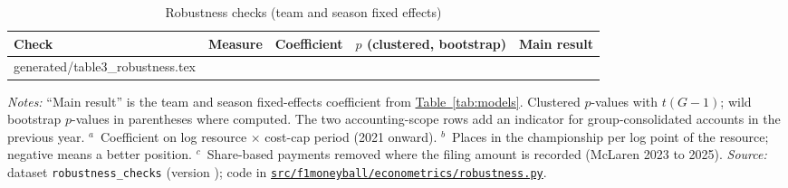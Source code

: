 \documentclass[11pt,a4paper]{article}
\newcommand{\repo}{https://github.com/NahianIbnat-2000/F1-moneyball}
\newcommand{\code}[1]{\href{\repo/blob/main/#1}{\nolinkurl{#1}}}
\begin{document}
\begin{table}[htbp]
\centering
\begin{threeparttable}
\caption{Robustness checks (team and season fixed effects)}
\label{tab:rob}
\small
\begin{tabular}{@{}>{\raggedright\arraybackslash}p{4.6cm}lccc@{}}
\toprule
Check & Measure & Coefficient & $p$ (clustered, bootstrap) & Main result \\
\midrule
{} generated/table3_robustness.tex 
\bottomrule
\end{tabular}
\begin{tablenotes}[flushleft]\footnotesize
\item \textit{Notes:} ``Main result'' is the team and season fixed-effects coefficient from \hyperref[tab:models]{Table~\ref*{tab:models}}.
Clustered $p$-values with $t(G-1)$; wild bootstrap $p$-values in parentheses where computed. The two accounting-scope rows add an
indicator for group-consolidated accounts in the previous year.
$^{a}$~Coefficient on log resource $\times$ cost-cap period (2021 onward).
$^{b}$~Places in the championship per log point of the resource; negative means a better position.
$^{c}$~Share-based payments removed where the filing amount is recorded (McLaren 2023 to 2025).
\textit{Source:} dataset \texttt{robustness\_checks} (version \VerRobustnessChecks); code in
\code{src/f1moneyball/econometrics/robustness.py}.
\end{tablenotes}
\end{threeparttable}
\end{table}
\end{document}
